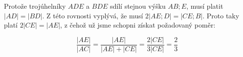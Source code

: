\documentclass{fkssolpub}
\author{Ondřej Sedláček}
\begin{document}
Protože trojúhelníky $ADE$ a $BDE$ sdílí stejnou výšku $AB;E$, musí platit
$|AD| = |BD|$. Z této rovnosti vyplývá, že musí $2|AE;D| = |CE;B|$. Proto
taky platí $2|CE| = |AE|$, z čehož už jsme schopni získat požadovaný poměr:

\[
	\frac{|AE|}{|AC|} = \frac{|AE|}{|AE| + |CE|} = \frac{2|CE|}{3|CE|} = \frac{2}{3}
\]
\end{document}

